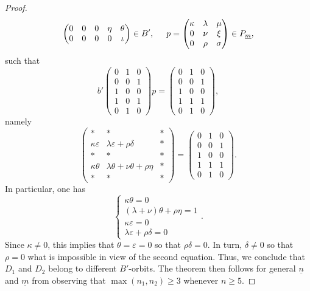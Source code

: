 \documentclass[pdftex]{sigma}
\numberwithin{equation}{section}
\theoremstyle{definition}
\theoremstyle{plain}
\theoremstyle{plain}
\theoremstyle{plain}
\theoremstyle{plain}
\begin{document}
\begin{proof}
\begin{equation*}
\begin{pmatrix}
	0 & 0 & 0 & \eta & \theta \\
	0 & 0 & 0 & 0 & \iota
\end{pmatrix} \in B', \hspace{5mm} p = \begin{pmatrix}
	\kappa & \lambda & \mu \\
	0 & \nu & \xi \\
	0 & \rho & \sigma \\
\end{pmatrix} \in P_{\underline m},
\end{equation*}
such that
\begin{equation*}
	b' \begin{pmatrix}
	0 & 1 & 0 \\
	0 & 0 & 1 \\
	1 & 0 & 0 \\
	1 & 0 & 1 \\
	0 & 1 & 0
\end{pmatrix}p = \begin{pmatrix}
	0 & 1 & 0 \\
	0 & 0 & 1 \\
	1 & 0 & 0 \\
	1 & 1 & 1 \\
	0 & 1 & 0
\end{pmatrix},
\end{equation*}
namely
\begin{equation*}
	\begin{pmatrix}
	\ast & \ast & \ast \\
	\kappa \varepsilon & \lambda \varepsilon + \rho \delta & \ast \\
	\ast & \ast & \ast \\
	\kappa \theta & \lambda \theta + \nu \theta + \rho \eta & \ast \\
	\ast & \ast & \ast
\end{pmatrix} = \begin{pmatrix}
	0 & 1 & 0 \\
	0 & 0 & 1 \\
	1 & 0 & 0 \\
	1 & 1 & 1 \\
	0 & 1 & 0
\end{pmatrix}.
\end{equation*}
In particular, one has
\begin{equation*}
	\begin{cases}
	\kappa \theta = 0 \\
	(\lambda+\nu)\theta + \rho \eta = 1 \\
	\kappa \varepsilon = 0 \\
	\lambda \varepsilon + \rho \delta = 0
\end{cases}.
\end{equation*}
Since $\kappa \neq 0$, this implies that $\theta = \varepsilon = 0$ so that $\rho \delta = 0$. In turn, $\delta \neq 0$ so that $\rho = 0$ what is impossible in view of the second equation. Thus, we conclude that $D_1$ and $D_2$ belong to different $B'$-orbits. The theorem then follows for general $\underline n$ and $\underline m$ from observing that $\max(n_1,n_2) \geqslant 3$ whenever $n \geqslant 5$.
\end{proof}
\end{document}
